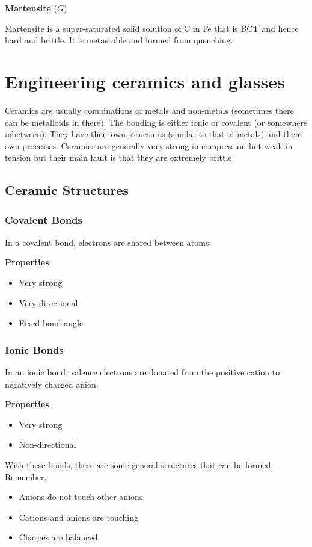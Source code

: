 \documentclass[12pt]{article}
\begin{document}
\begin{theorem*}
  \textbf{Martensite} ($G$)

  Martensite is a super-saturated solid solution of C in Fe that is BCT and hence hard and brittle.
  It is metastable and formed from quenching. 
\end{theorem*}

\section{Engineering ceramics and glasses}
Ceramics are usually combinations of metals and non-metals (sometimes there can be metalloids in there). 
The bonding is either ionic or covalent (or somewhere inbetween).
They have their own structures (similar to that of metals) and their own processes. 
Ceramics are generally very strong in compression but weak in tension but their main fault is that they are extremely brittle.

\subsection{Ceramic Structures}
\subsubsection{Covalent Bonds}
In a covalent bond, electrons are shared between atoms. 

\textbf{Properties}
\begin{itemize}
  \item Very strong
  \item Very directional
  \item Fixed bond angle 
\end{itemize}

\subsubsection{Ionic Bonds}
In an ionic bond, valence electrons are donated from the positive cation to negatively charged anion.

\textbf{Properties}
\begin{itemize}
  \item Very strong 
  \item Non-directional
\end{itemize}

With these bonds, there are some general structures that can be formed.
Remember,
\begin{itemize}
  \item Anions do not touch other anions
  \item Cations and anions are touching
  \item Charges are balanced
\end{itemize}
\end{document}

